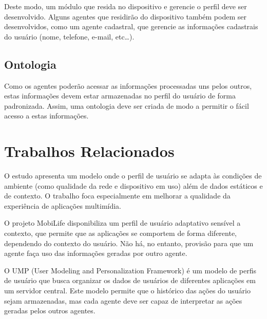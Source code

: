 \documentclass[a4paper, twocolumn]{article}
\begin{document}
Deste modo, um módulo que resida no dispositivo e gerencie o perfil deve ser desenvolvido. Alguns agentes que residirão do dispositivo também podem ser desenvolvidos, como um agente cadastral, que gerencie as informações cadastrais do usuário (nome, telefone, e-mail, etc\ldots).


\subsection{Ontologia} \label{sec:ontologia}

Como os agentes poderão acessar as informações processadas uns pelos outros, estas informações devem estar armazenadas no perfil do usuário de forma padronizada. Assim, uma ontologia deve ser criada de modo a permitir o fácil acesso a estas informações.


\section{Trabalhos Relacionados} \label{sec:relacionados}


O estudo \cite{chellouche10} apresenta um modelo onde o perfil de usuário se adapta às condições de ambiente (como qualidade da rede e dispositivo em uso) além de dados estáticos e de contexto. O trabalho foca especialmente em melhorar a qualidade da experiência de aplicações multimídia.


O projeto MobiLife \cite{sutterer07} disponibiliza um perfil de usuário adaptativo sensível a contexto, que permite que as aplicações se comportem de forma diferente, dependendo do contexto do usuário. Não há, no entanto, provisão para que um agente faça uso das informações geradas por outro agente.


O UMP (User Modeling and Personalization Framework) \cite{korth07} é um modelo de perfis de usuário que busca organizar os dados de usuários de diferentes aplicações em um servidor central. Este modelo permite que o histórico das ações do usuário sejam armazenadas, mas cada agente deve ser capaz de interpretar as ações geradas pelos outros agentes.
\end{document}

